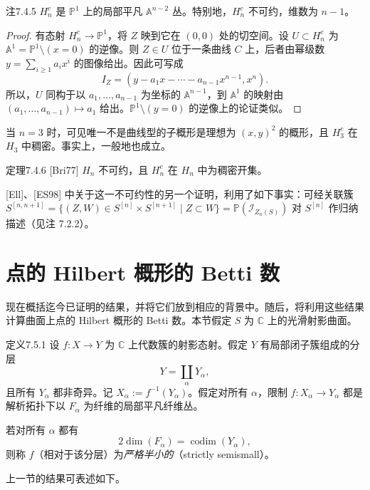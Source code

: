 \begin{origstatement}{注}{7.4.5}\label{ch07:7.4.5}
$H_n^c$ 是 $\mathbb P^1$ 上的局部平凡 $\mathbb A^{n-2}$ 丛。特别地，$H_n^c$ 不可约，维数为 $n-1$。
\end{origstatement}
\begin{proof}
有态射 $H_n^c\to\mathbb P^1$，将 $Z$ 映到它在 $(0,0)$ 处的切空间。设 $U\subset H_n^c$ 为 $\mathbb A^1=\mathbb P^1\setminus(x=0)$ 的逆像。则 $Z\in U$ 位于一条曲线 $C$ 上，后者由幂级数 $y=\sum_{i\geq1}a_ix^i$ 的图像给出。因此可写成
\[
I_Z=(y-a_1x-\cdots-a_{n-1}x^{n-1},x^n).
\]
所以，$U$ 同构于以 $a_1,\ldots,a_{n-1}$ 为坐标的 $\mathbb A^{n-1}$，到 $\mathbb A^1$ 的映射由 $(a_1,\ldots,a_{n-1})\mapsto a_1$ 给出。$\mathbb P^1\setminus(y=0)$ 的逆像上的论证类似。
\end{proof}
当 $n=3$ 时，可见唯一不是曲线型的子概形是理想为 $(x,y)^2$ 的概形，且 $H_3^c$ 在 $H_3$ 中稠密。事实上，一般地也成立。

\begin{origstatement}{定理}{7.4.6}\label{ch07:7.4.6}
[Bri77] $H_n$ 不可约，且 $H_n^c$ 在 $H_n$ 中为稠密开集。
\end{origstatement}
[Ell]、[ES98] 中关于这一不可约性的另一个证明，利用了如下事实：可经关联簇 $S^{[n,n+1]}=\{(Z,W)\in S^{[n]}\times S^{[n+1]}\mid Z\subset W\}=\mathbb P(\mathcal I_{Z_n(S)})$ 对 $S^{[n]}$ 作归纳描述（见注 7.2.2）。
\section{点的 Hilbert 概形的 Betti 数}
现在概括迄今已证明的结果，并将它们放到相应的背景中。随后，将利用这些结果计算曲面上点的 Hilbert 概形的 Betti 数。本节假定 $S$ 为 $\mathbb C$ 上的光滑射影曲面。

\begin{origstatement}{定义}{7.5.1}\label{ch07:7.5.1}
设 $f:X\to Y$ 为 $\mathbb C$ 上代数簇的射影态射。假定 $Y$ 有局部闭子簇组成的分层
\[
Y=\coprod_\alpha Y_\alpha,
\]
且所有 $Y_\alpha$ 都非奇异。记 $X_\alpha:=f^{-1}(Y_\alpha)$。假定对所有 $\alpha$，限制 $f:X_\alpha\to Y_\alpha$ 都是解析拓扑下以 $F_\alpha$ 为纤维的局部平凡纤维丛。

若对所有 $\alpha$ 都有
\[
2\dim(F_\alpha)=\operatorname{codim}(Y_\alpha),
\]
则称 $f$（相对于该分层）为\emph{严格半小的}（strictly semismall）。
\end{origstatement}
上一节的结果可表述如下。

